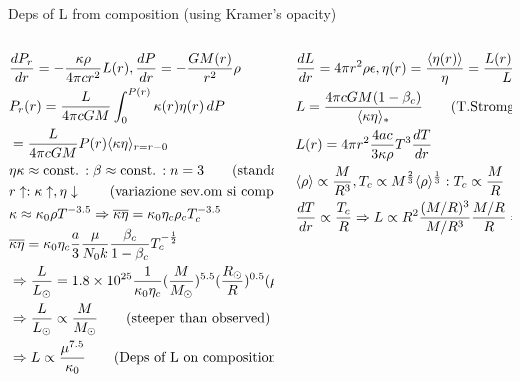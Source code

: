 \begin{frame}{Deps of L from composition (using Kramer's opacity)}
    \begin{columns}[T]
        \begin{column}{0.5\textwidth}
            \begin{align*}
                &\TDy{r}{P_r}=-\frac{\kappa\rho}{4\pi cr^2}L(r), \TDy{r}{P}=-\frac{GM(r)}{r^2}\rho\\
                &P_r(r)=\frac{L}{4\pi cGM}\int_0^{P(r)}\kappa(r)\eta(r)\,dP\\
                &=\frac{L}{4\pi cGM}P(r)\exv{\kappa\eta}_{r=r-0}\\
                &\eta\kappa\approx\const{}:\beta\approx\const{}:n=3\tag{standard model}\\
                &\xincreases{r}:\xincreases{\kappa},\xdecreases{\eta}\tag{variazione sev.om si compensano: sm approx real *}\\
                &\kappa\approx\kappa_0\rho T^{-3.5}\Rightarrow\overline{\kappa\eta}=\kappa_0\eta_c\rho_cT_c^{-3.5}\\
                &\overline{\kappa\eta}=\kappa_0\eta_c \frac{a}{3}\frac{\mu}{N_0k}\frac{\beta_c}{1-\beta_c}T_c^{-\frac{1}{2}}\\
                &\Rightarrow \frac{L}{\lsun{}}=\num{1.8e25}\frac{1}{\kappa_0\eta_c}(\frac{M}{\msun{}})^{5.5}(\frac{\rsun{}}{R})^{0.5}(\mu\beta_c)^{7.5}\\
                &\Rightarrow\frac{L}{\lsun{}}\propto \frac{M}{\msun{}}\tag{steeper than observed}\\
                &\Rightarrow L\propto \frac{\mu^{7.5}}{\kappa_0}\tag{Deps of L on composition}
            \end{align*}
        \end{column}
        \begin{column}{0.5\textwidth}
            \begin{align*}
                &\TDy{r}{L}=4\pi r^2\rho\epsilon, \eta(r)=\frac{\exv{\eta(r)}}{\eta}=\frac{L(r)/M(r)}{L/M}:\\
                &L=\frac{4\pi cGM(1-\beta_c)}{\exv{\kappa\eta}_*}\tag{T.Stromgren}\\
                &L(r)=4\pi r^2 \frac{4ac}{3\kappa\rho}T^3\TDy{r}{T}\\
                &\exv{\rho}\propto \frac{M}{R^3},T_c\propto M^{\frac{2}{3}}\exv{\rho}^{\frac{1}{3}}: T_c\propto \frac{M}{R}\tag{Standard Model}\\
                &\TDy{r}{T}\propto \frac{T_c}{R}\Rightarrow L\propto R^2\frac{(M/R)^3}{M/R^3}\frac{M/R}{R}=M^3
            \end{align*}
        \end{column}
    \end{columns}
    
\end{frame}

